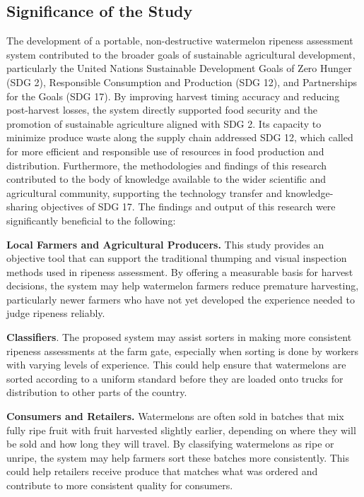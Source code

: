 \begin{thesisprose}
\section{Significance of the Study}

The development of a portable, non-destructive watermelon ripeness assessment system contributed to the broader goals of sustainable agricultural development, particularly the United Nations Sustainable Development Goals of Zero Hunger (SDG 2), Responsible Consumption and Production (SDG 12), and Partnerships for the Goals (SDG 17). By improving harvest timing accuracy and reducing post-harvest losses, the system directly supported food security and the promotion of sustainable agriculture aligned with SDG 2. Its capacity to minimize produce waste along the supply chain addressed SDG 12, which called for more efficient and responsible use of resources in food production and distribution. Furthermore, the methodologies and findings of this research contributed to the body of knowledge available to the wider scientific and agricultural community, supporting the technology transfer and knowledge-sharing objectives of SDG 17. The findings and output of this research were significantly beneficial to the following:

\textbf{Local Farmers and Agricultural Producers.} This study provides an objective tool that can support the traditional thumping and visual inspection methods used in ripeness assessment. By offering a measurable basis for harvest decisions, the system may help watermelon farmers reduce premature harvesting, particularly newer farmers who have not yet developed the experience needed to judge ripeness reliably.

\textbf{Classifiers}. The proposed system may assist sorters in making more consistent ripeness assessments at the farm gate, especially when sorting is done by workers with varying levels of experience. This could help ensure that watermelons are sorted according to a uniform standard before they are loaded onto trucks for distribution to other parts of the country.

\textbf{Consumers and Retailers.} Watermelons are often sold in batches that mix fully ripe fruit with fruit harvested slightly earlier, depending on where they will be sold and how long they will travel. By classifying watermelons as ripe or unripe, the system may help farmers sort these batches more consistently. This could help retailers receive produce that matches what was ordered and contribute to more consistent quality for consumers.


\end{thesisprose}

